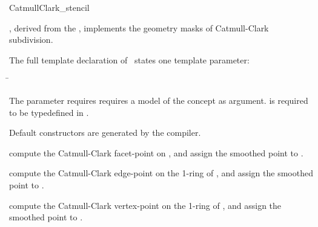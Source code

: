 \begin{ccRefClass}{CatmullClark_stencil}

\ccDefinition

\ccClassTemplateName , derived from the ,
implements the geometry masks of Catmull-Clark subdivision. 


\ccParameters

The full template declaration of \ccClassTemplateName\ states one
template parameter:

\begin{tabbing}
 \= 
\end{tabbing}
   
The  parameter requires requires a model of 
the  concept as argument. 
 is required to be typedefined in .

\ccCreation

Default constructors are generated by the compiler.

\ccThree{}{}{}

{compute the Catmull-Clark facet-point on , 
and assign the smoothed point to .}

{compute the Catmull-Clark edge-point on the 1-ring
of , and assign the smoothed point to .}

{compute the Catmull-Clark vertex-point on the 
1-ring of , and assign the smoothed point to .}


\ccSeeAlso

\\
\\
\\

\end{ccRefClass}

\ccRefPageEnd


